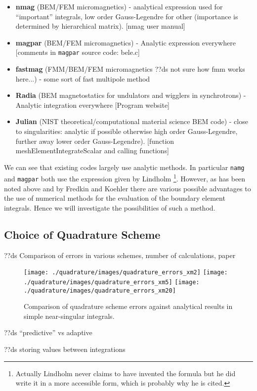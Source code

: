 \begin{itemize}
\item \textbf{nmag} (BEM/FEM micromagnetics) - analytical expression used for ``important'' integrals, low order Gauss-Legendre for other (importance is determined by hierarchical matrix). [nmag user manual]
\item \textbf{magpar} (BEM/FEM micromagnetics) - Analytic expression everywhere [comments in \texttt{magpar} source code: bele.c]
\item \textbf{fastmag} (FMM/BEM/FEM micromagnetics ??ds not sure how fmm works here...) - some sort of fast multipole method
\item \textbf{Radia} (BEM magnetostatics for undulators and wigglers in synchrotrons) - Analytic integration everywhere [Program website]
\item \textbf{Julian} (NIST theoretical/computational material science BEM code) - close to singularities: analytic if possible otherwise high order Gauss-Legendre, further away lower order Gauss-Legendre). [function meshElementIntegrateScalar and calling functions]
\end{itemize}

We can see that existing codes largely use analytic methods. In particular \texttt{namg} and \texttt{magpar} both use the expression given by Lindholm \cite{Lindholm1984} \footnote{Actually Lindholm never claims to have invented the formula but he did write it in a more accessible form, which is probably why he is cited.}. However, as has been noted above and by Fredkin and Koehler \cite{Fredkin1990} there are various possible advantages to the use of numerical methods for the evaluation of the boundary element integrals. Hence we will investigate the possibilities of such a method.

\subsection{Choice of Quadrature Scheme}

??ds Comparison of errors in various schemes, number of calculations, paper \cite{Trefethen2008}
\begin{figure}
  \center
  \texttt{[image: ./quadrature/images/quadrature\_errors\_xm2]}
  \texttt{[image: ./quadrature/images/quadrature\_errors\_xm5]}
  \texttt{[image: ./quadrature/images/quadrature\_errors\_xm20]}
  \caption{
    \label{fig:exact_quad_errors}
    Comparison of quadrature scheme errors against analytical results in simple near-singular integrals.
  }
\end{figure}



??ds ``predictive'' vs adaptive

??ds storing values between integrations







